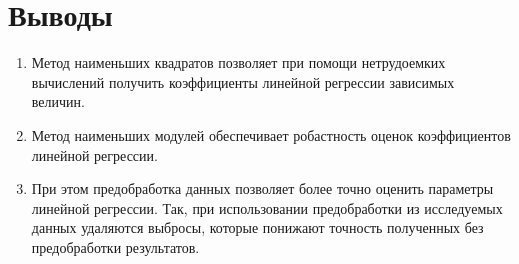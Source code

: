 \documentclass[12pt]{article}
\begin{document}
\section{Выводы}
\begin{enumerate}
    \item Метод наименьших квадратов позволяет при помощи нетрудоемких вычислений получить коэффициенты линейной регрессии зависимых величин.
    \item Метод наименьших модулей обеспечивает робастность оценок коэффициентов линейной регрессии.
    \item При этом предобработка данных позволяет более точно оценить параметры линейной регрессии. Так, при использовании предобработки из исследуемых данных удаляются выбросы, которые понижают точность полученных без предобработки результатов.
\end{enumerate}
\newpage
\end{document}
